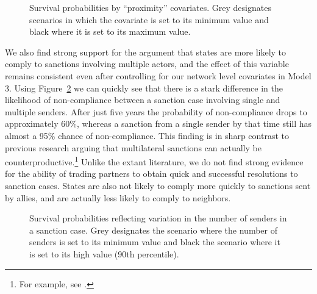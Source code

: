 \begin{figure}[ht]
	\centering
	\caption{Survival probabilities by ``proximity'' covariates. Grey designates scenarios in which the covariate is set to its minimum value and black where it is set to its maximum value.}

        \resizebox{.55\textwidth}{!}{}	


	
	\label{fig:monSurv}
\end{figure}


We also find strong support for the argument that states are more likely to comply to sanctions involving multiple actors, and the effect of this variable remains consistent even after controlling for our network level covariates in Model 3. Using Figure~\ref{fig:nosSurv} we can quickly see that there is a stark difference in the likelihood of non-compliance between a sanction case involving single and multiple senders. After just five years the probability of non-compliance drops to approximately 60\%, whereas a sanction from a single sender by that time still has almost a 95\% chance of non-compliance. This finding is in sharp contrast to previous research arguing that multilateral sanctions can actually be counterproductive.\footnote{For example, see \citealp{drezner2000bargaining}.} Unlike the extant literature, we do not find strong evidence for the ability of trading partners to obtain quick and successful resolutions to sanction cases. States are also not likely to comply more quickly to sanctions sent by allies, and are actually less likely to comply to neighbors. 

\begin{figure}[ht]
	\centering
	\caption{Survival probabilities reflecting variation in the number of senders in a sanction case. Grey designates the scenario where the number of senders is set to its minimum value and black the scenario where it is set to its high value (90th percentile).}
	\resizebox{0.55\textwidth}{!}{}
	\label{fig:nosSurv}
\end{figure}

